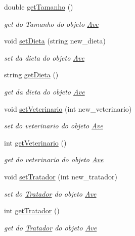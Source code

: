 \begin{DoxyCompactItemize}
double \mbox{\hyperlink{class_ave_a43030ccb3e8297b74c7a38184055730f}{get\+Tamanho}} ()
\begin{DoxyCompactList}\small\item\em get do Tamanho do objeto \mbox{\hyperlink{class_ave}{Ave}} \end{DoxyCompactList}\item 
void \mbox{\hyperlink{class_ave_ad829e2e77d0dc757d29c2c7a21141658}{set\+Dieta}} (string new\+\_\+dieta)
\begin{DoxyCompactList}\small\item\em set da dieta do objeto \mbox{\hyperlink{class_ave}{Ave}} \end{DoxyCompactList}\item 
string \mbox{\hyperlink{class_ave_aabab5e42561bc10a1c172106f6488d2a}{get\+Dieta}} ()
\begin{DoxyCompactList}\small\item\em get da dieta do objeto \mbox{\hyperlink{class_ave}{Ave}} \end{DoxyCompactList}\item 
void \mbox{\hyperlink{class_ave_a5d351f4be73bf31423b8f55d1b344b14}{set\+Veterinario}} (int new\+\_\+veterinario)
\begin{DoxyCompactList}\small\item\em set do veterinario do objeto \mbox{\hyperlink{class_ave}{Ave}} \end{DoxyCompactList}\item 
int \mbox{\hyperlink{class_ave_a9330b776620daca446414f388779d829}{get\+Veterinario}} ()
\begin{DoxyCompactList}\small\item\em get do veterinario do objeto \mbox{\hyperlink{class_ave}{Ave}} \end{DoxyCompactList}\item 
void \mbox{\hyperlink{class_ave_a15605d35f11972f6275ba9ca6f2813a0}{set\+Tratador}} (int new\+\_\+tratador)
\begin{DoxyCompactList}\small\item\em set do \mbox{\hyperlink{class_tratador}{Tratador}} do objeto \mbox{\hyperlink{class_ave}{Ave}} \end{DoxyCompactList}\item 
int \mbox{\hyperlink{class_ave_a5abfd5f54a32602a2cce892e3f5aa5ac}{get\+Tratador}} ()
\begin{DoxyCompactList}\small\item\em get do \mbox{\hyperlink{class_tratador}{Tratador}} do objeto \mbox{\hyperlink{class_ave}{Ave}} \end{DoxyCompactList}\item 

\end{DoxyCompactItemize}
